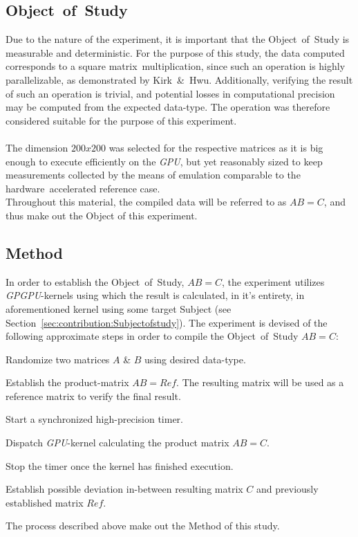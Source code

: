 \documentclass[fleqn,10pt]{SelfArx} %
\begin{document}
\subsection{Object~of~Study}
\label{sec:contribution:objectofstudy}
Due to the nature of the experiment, it is important that the Object~of~Study is measurable and deterministic. For the purpose of this study, the data computed corresponds to a square matrix~multiplication, since such an operation is highly parallelizable, as demonstrated by Kirk~\&~Hwu\cite[ch.~3]{Kirk:2010:PMP:1841511}. Additionally, verifying the result of such an operation is trivial, and potential losses in computational precision may be computed from the expected data-type. The operation was therefore considered suitable for the purpose of this experiment.\\
\\
The dimension $200x200$ was selected for the respective matrices as it is big enough to execute efficiently on the \textit{GPU}, but yet reasonably sized to keep measurements collected by the means of emulation comparable to the hardware~accelerated reference case. \\
Throughout this material, the compiled data will be referred to as $AB=C$, and thus make out the Object of this experiment.

\subsection{Method}
\label{sec:contribution:method}
In order to establish the Object~of~Study, $AB=C$, the experiment utilizes \textit{GPGPU}-kernels using which the result is calculated, in it’s entirety, in aforementioned kernel using some target Subject (see Section~\ref{sec:contribution:Subjectofstudy}). The experiment is devised of the following approximate steps in order to compile the Object~of~Study $AB=C$:
\begin{enumerate*}
	\item Randomize two matrices $A$ \& $B$ using desired data-type.
	\item Establish the product-matrix $AB=Ref$. The resulting matrix will be used as a reference matrix to verify the final result.
	\item Start a synchronized high-precision timer.
	\item Dispatch \textit{GPU}-kernel calculating the product matrix $AB=C$.
	\item Stop the timer once the kernel has finished execution.
	\item Establish possible deviation in-between resulting matrix $C$ and previously established matrix $Ref$.
\end{enumerate*}
The process described above make out the Method of this study.
\end{document}
